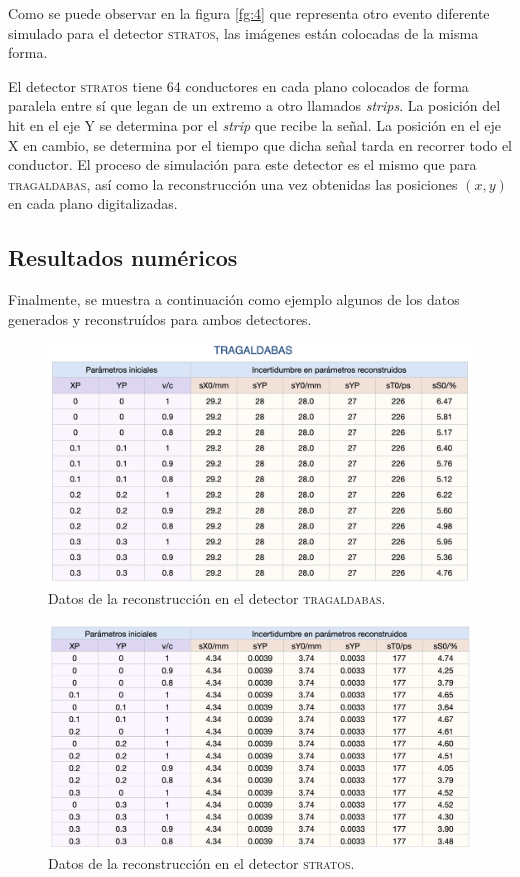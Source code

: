 \documentclass[a4paper]{article}
\begin{document}
Como se puede observar en la figura \ref{fg:4} que representa otro evento diferente simulado para el detector \textsc{stratos}, las imágenes están colocadas de la misma forma.

El detector \textsc{stratos} tiene 64 conductores en cada plano colocados de forma paralela entre sí que legan de un extremo a otro llamados \textit{strips}. La posición del hit en el eje Y se determina por el \textit{strip} que recibe la señal. La posición en el eje X en cambio, se determina por el tiempo que dicha señal tarda en recorrer todo el conductor. El proceso de simulación para este detector es el mismo que para \textsc{tragaldabas}, así como la reconstrucción una vez obtenidas las posiciones $(x, y)$ en cada plano digitalizadas.

\subsection{Resultados numéricos}

Finalmente, se muestra a continuación como ejemplo algunos de los datos generados y reconstruídos para ambos detectores.

\begin{figure}[H] 
  \centering
  \includegraphics[width=\linewidth]{tabla_param_tragas.png} 
  \caption{Datos de la reconstrucción en el detector \textsc{tragaldabas}.}
  \label{fg:datos_tragas} 
\end{figure}


\begin{figure}[H] 
  \centering
  \includegraphics[width=\linewidth]{tabla_param_stratos.png} 
  \caption{Datos de la reconstrucción en el detector \textsc{stratos}.}
  \label{fg:datos_stratos} 
\end{figure}
\end{document}
